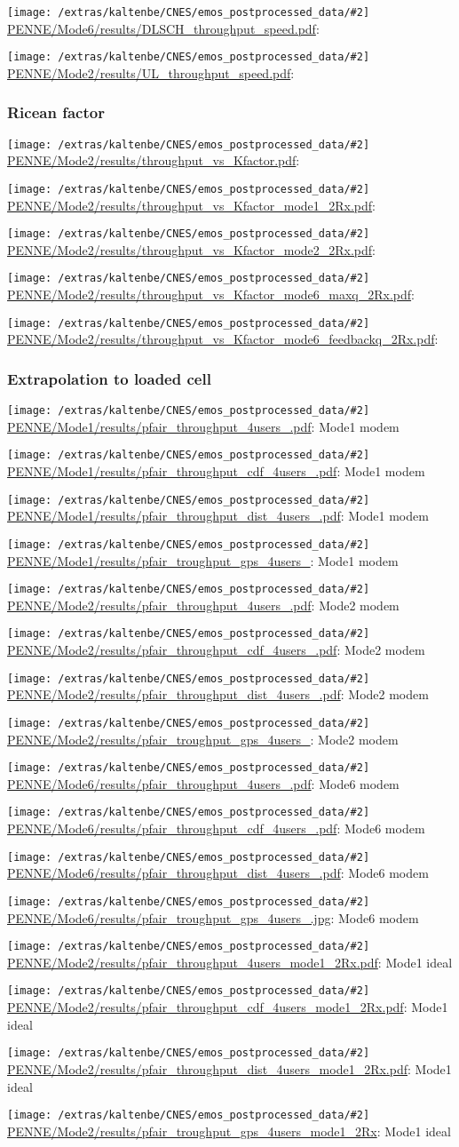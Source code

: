 \documentclass[a4paper,10pt]{article}
\newcommand{\printfile}[2][]{
 \begin{minipage}{8cm}
  \centering
  \texttt{[image: /extras/kaltenbe/CNES/emos\_postprocessed\_data/\#2]}
  \url{#2}: #1

 \end{minipage}
}
\begin{document}
\printfile{PENNE/Mode6/results/DLSCH_throughput_speed.pdf}
\printfile{PENNE/Mode2/results/UL_throughput_speed.pdf}

\subsubsection{Ricean factor}

\printfile{PENNE/Mode2/results/throughput_vs_Kfactor.pdf}

\printfile{PENNE/Mode2/results/throughput_vs_Kfactor_mode1_2Rx.pdf}
\printfile{PENNE/Mode2/results/throughput_vs_Kfactor_mode2_2Rx.pdf}

\printfile{PENNE/Mode2/results/throughput_vs_Kfactor_mode6_maxq_2Rx.pdf}
\printfile{PENNE/Mode2/results/throughput_vs_Kfactor_mode6_feedbackq_2Rx.pdf}


\subsubsection{Extrapolation to loaded cell}

\printfile[Mode1 modem]{PENNE/Mode1/results/pfair_throughput_4users_.pdf}
\printfile[Mode1 modem]{PENNE/Mode1/results/pfair_throughput_cdf_4users_.pdf}

\printfile[Mode1 modem]{PENNE/Mode1/results/pfair_throughput_dist_4users_.pdf}
\printfile[Mode1 modem]{PENNE/Mode1/results/pfair_troughput_gps_4users_}

\printfile[Mode2 modem]{PENNE/Mode2/results/pfair_throughput_4users_.pdf}
\printfile[Mode2 modem]{PENNE/Mode2/results/pfair_throughput_cdf_4users_.pdf}

\printfile[Mode2 modem]{PENNE/Mode2/results/pfair_throughput_dist_4users_.pdf}
\printfile[Mode2 modem]{PENNE/Mode2/results/pfair_troughput_gps_4users_}

\printfile[Mode6 modem]{PENNE/Mode6/results/pfair_throughput_4users_.pdf}
\printfile[Mode6 modem]{PENNE/Mode6/results/pfair_throughput_cdf_4users_.pdf}

\printfile[Mode6 modem]{PENNE/Mode6/results/pfair_throughput_dist_4users_.pdf}
\printfile[Mode6 modem]{PENNE/Mode6/results/pfair_troughput_gps_4users_.jpg}

\printfile[Mode1 ideal]{PENNE/Mode2/results/pfair_throughput_4users_mode1_2Rx.pdf}
\printfile[Mode1 ideal]{PENNE/Mode2/results/pfair_throughput_cdf_4users_mode1_2Rx.pdf}

\printfile[Mode1 ideal]{PENNE/Mode2/results/pfair_throughput_dist_4users_mode1_2Rx.pdf}
\printfile[Mode1 ideal]{PENNE/Mode2/results/pfair_troughput_gps_4users_mode1_2Rx}
\end{document}
